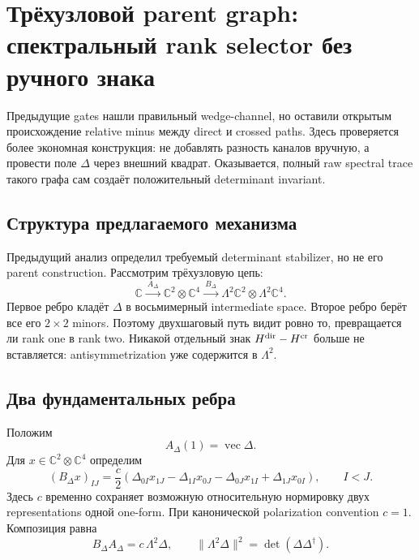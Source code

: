 \chapter{Трёхузловой parent graph: спектральный rank selector без ручного знака}

Предыдущие gates нашли правильный wedge-channel, но оставили открытым
происхождение relative minus между direct и crossed paths. Здесь проверяется
более экономная конструкция: не добавлять разность каналов вручную, а провести
поле \(\Delta\) через внешний квадрат. Оказывается, полный raw spectral trace
такого графа сам создаёт положительный determinant invariant.

\section{Структура предлагаемого механизма}

Предыдущий анализ определил требуемый determinant stabilizer, но не его
parent construction. Рассмотрим трёхузловую цепь:
\begin{equation}
 \mathbb C
 \xrightarrow{\ A_\Delta\ }
 \mathbb C^2\otimes\mathbb C^4
 \xrightarrow{\ B_\Delta\ }
 \Lambda^2\mathbb C^2\otimes\Lambda^2\mathbb C^4.
 \label{eq:ps-three-node-chain}
\end{equation}
Первое ребро кладёт \(\Delta\) в восьмимерный intermediate space. Второе
ребро берёт все его \(2\times2\) minors. Поэтому двухшаговый путь видит ровно
то, превращается ли rank one в rank two. Никакой отдельный знак
\(H^{\rm dir}-H^{\rm cr}\) больше не вставляется: antisymmetrization уже
содержится в \(\Lambda^2\).

\section{Два фундаментальных ребра}

Положим
\begin{equation}
 A_\Delta(1)=\operatorname{vec}\Delta.
\end{equation}
Для \(x\in\mathbb C^2\otimes\mathbb C^4\) определим
\begin{equation}
 (B_\Delta x)_{IJ}
 =\frac{c}{2}\left(
 \Delta_{0I}x_{1J}-\Delta_{1I}x_{0J}
 -\Delta_{0J}x_{1I}+\Delta_{1J}x_{0I}
 \right),
 \qquad I<J.
 \label{eq:ps-second-wedge-edge}
\end{equation}
Здесь \(c\) временно сохраняет возможную относительную нормировку двух
representations одной one-form. При канонической polarization convention
\(c=1\). Композиция равна
\begin{equation}
 \boxed{B_\Delta A_\Delta=c\,\Lambda^2\Delta},
 \qquad
 \|\Lambda^2\Delta\|^2
 =\det(\Delta\Delta^\dagger).
 \label{eq:ps-three-node-minor-identity}
\end{equation}

